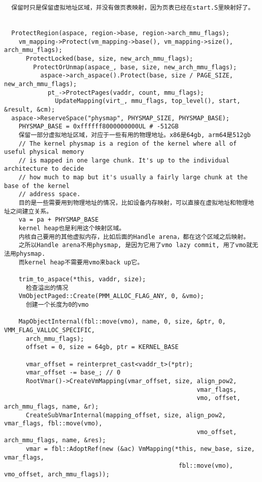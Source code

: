 \begin{verbatim}
  保留时只是保留虚拟地址区域，并没有做页表映射，因为页表已经在start.S里映射好了。
  

  ProtectRegion(aspace, region->base, region->arch_mmu_flags);
    vm_mapping->Protect(vm_mapping->base(), vm_mapping->size(), arch_mmu_flags);
      ProtectLocked(base, size, new_arch_mmu_flags);
        ProtectOrUnmap(aspace_, base, size, new_arch_mmu_flags);
          aspace->arch_aspace().Protect(base, size / PAGE_SIZE, new_arch_mmu_flags);
            pt_->ProtectPages(vaddr, count, mmu_flags);
              UpdateMapping(virt_, mmu_flags, top_level(), start, &result, &cm);
  aspace->ReserveSpace("physmap", PHYSMAP_SIZE, PHYSMAP_BASE);
    PHYSMAP_BASE = 0xffffff8000000000UL # -512GB
    保留一部分虚拟地址区域，对应于一些有用的物理地址。x86是64gb, arm64是512gb
    // The kernel physmap is a region of the kernel where all of useful physical memory
    // is mapped in one large chunk. It's up to the individual architecture to decide
    // how much to map but it's usually a fairly large chunk at the base of the kernel
    // address space.
    目的是一些需要用到物理地址的情况，比如设备内存映射，可以直接在虚拟地址和物理地址之间建立关系。
    va = pa + PHYSMAP_BASE
    kernel heap也是利用这个映射区域。
    内核自己要用的其他虚拟内存，比如后面的Handle arena，都在这个区域之后映射。
    之所以Handle arena不用physmap, 是因为它用了vmo lazy commit, 用了vmo就无法用physmap.
    而kernel heap不需要用vmo来back up它。

    trim_to_aspace(*this, vaddr, size);
      检查溢出的情况
    VmObjectPaged::Create(PMM_ALLOC_FLAG_ANY, 0, &vmo);  
      创建一个长度为0的vmo

    MapObjectInternal(fbl::move(vmo), name, 0, size, &ptr, 0, VMM_FLAG_VALLOC_SPECIFIC,
      arch_mmu_flags);
      offset = 0, size = 64gb, ptr = KERNEL_BASE

      vmar_offset = reinterpret_cast<vaddr_t>(*ptr);
      vmar_offset -= base_; // 0
      RootVmar()->CreateVmMapping(vmar_offset, size, align_pow2,
                                                     vmar_flags,
                                                     vmo, offset, arch_mmu_flags, name, &r);
      CreateSubVmarInternal(mapping_offset, size, align_pow2, vmar_flags, fbl::move(vmo),
                                                     vmo_offset, arch_mmu_flags, name, &res);
      vmar = fbl::AdoptRef(new (&ac) VmMapping(*this, new_base, size, vmar_flags,
                                                fbl::move(vmo), vmo_offset, arch_mmu_flags));
      

\end{verbatim}
